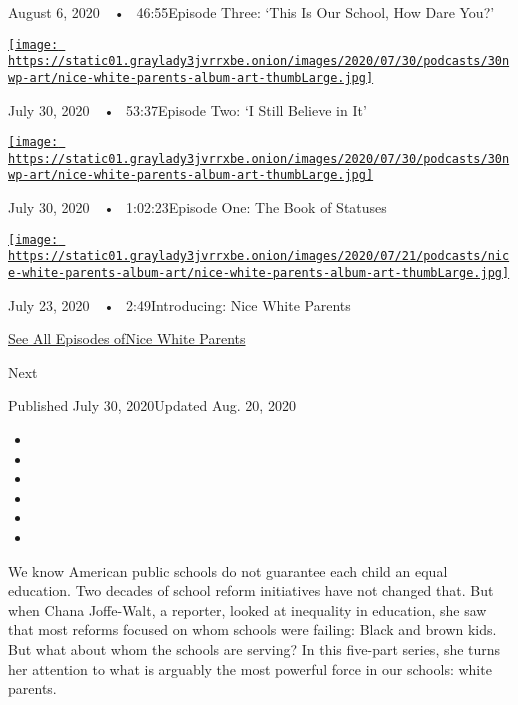 August 6, 2020~~•~ 46:55Episode Three: `This Is Our School, How Dare
You?'

\href{https://www.nytimes3xbfgragh.onion/2020/07/30/podcasts/nice-white-parents-serial-2.html?action=click\&module=audio-series-bar\&region=header\&pgtype=Article}{\texttt{[image: https://static01.graylady3jvrrxbe.onion/images/2020/07/30/podcasts/30nwp-art/nice-white-parents-album-art-thumbLarge.jpg]}}

July 30, 2020~~•~ 53:37Episode Two: `I Still Believe in It'

\href{https://www.nytimes3xbfgragh.onion/2020/07/30/podcasts/nice-white-parents-serial.html?action=click\&module=audio-series-bar\&region=header\&pgtype=Article}{\texttt{[image: https://static01.graylady3jvrrxbe.onion/images/2020/07/30/podcasts/30nwp-art/nice-white-parents-album-art-thumbLarge.jpg]}}

July 30, 2020~~•~ 1:02:23Episode One: The Book of Statuses

\href{https://www.nytimes3xbfgragh.onion/2020/07/23/podcasts/nice-white-parents-serial.html?action=click\&module=audio-series-bar\&region=header\&pgtype=Article}{\texttt{[image: https://static01.graylady3jvrrxbe.onion/images/2020/07/21/podcasts/nice-white-parents-album-art/nice-white-parents-album-art-thumbLarge.jpg]}}

July 23, 2020~~•~ 2:49Introducing: Nice White Parents

\href{https://www.nytimes3xbfgragh.onion/column/nice-white-parents}{See
All Episodes ofNice White Parents}

Next

Published July 30, 2020Updated Aug. 20, 2020

\begin{itemize}
\item
\item
\item
\item
\item
\item
\end{itemize}

We know American public schools do not guarantee each child an equal
education. Two decades of school reform initiatives have not changed
that. But when Chana Joffe-Walt, a reporter, looked at inequality in
education, she saw that most reforms focused on whom schools were
failing: Black and brown kids. But what about whom the schools are
serving? In this five-part series, she turns her attention to what is
arguably the most powerful force in our schools: white parents.

